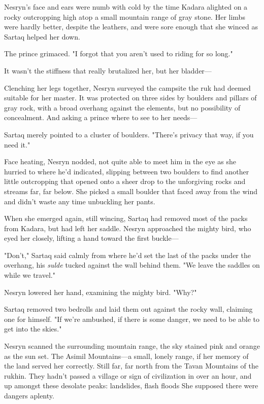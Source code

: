 Nesryn's face and ears were numb with cold by the time Kadara alighted on a rocky outcropping high atop a small mountain range of gray stone. Her limbs were hardly better, despite the leathers, and were sore enough that she winced as Sartaq helped her down.

The prince grimaced. "I forgot that you aren't used to riding for so long."

It wasn't the stiffness that really brutalized her, but her bladder---

Clenching her legs together, Nesryn surveyed the campsite the ruk had deemed suitable for her master. It was protected on three sides by boulders and pillars of gray rock, with a broad overhang against the elements, but no possibility of concealment. And asking a prince where to see to her needs---

Sartaq merely pointed to a cluster of boulders. "There's privacy that way, if you need it."

Face heating, Nesryn nodded, not quite able to meet him in the eye as she hurried to where he'd indicated, slipping between two boulders to find another little outcropping that opened onto a sheer drop to the unforgiving rocks and streams far, far below. She picked a small boulder that faced away from the wind and didn't waste any time unbuckling her pants.

When she emerged again, still wincing, Sartaq had removed most of the packs from Kadara, but had left her saddle. Nesryn approached the mighty bird, who eyed her closely, lifting a hand toward the first buckle---

"Don't," Sartaq said calmly from where he'd set the last of the packs under the overhang, his \emph{sulde} tucked against the wall behind them. "We leave the saddles on while we travel."

Nesryn lowered her hand, examining the mighty bird. "Why?"

Sartaq removed two bedrolls and laid them out against the rocky wall, claiming one for himself. "If we're ambushed, if there is some danger, we need to be able to get into the skies."

Nesryn scanned the surrounding mountain range, the sky stained pink and orange as the sun set. The Asimil Mountains---a small, lonely range, if her memory of the land served her correctly. Still far, far north from the Tavan Mountains of the rukhin. They hadn't passed a village or sign of civilization in over an hour, and up amongst these desolate peaks:
landslides, flash floods  She supposed there were dangers aplenty.

